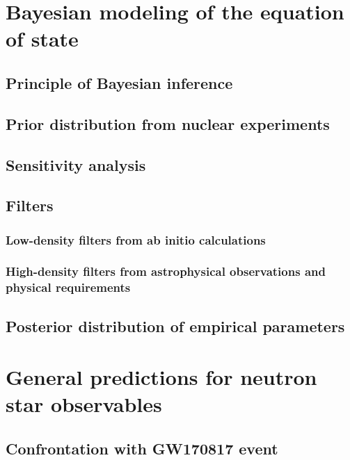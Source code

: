 \section{Bayesian modeling of the equation of state} %

\subsection{Principle of Bayesian inference} %

\subsection{Prior distribution from nuclear experiments} %

\subsection{Sensitivity analysis} %

\subsection{Filters} %

\subsubsection{Low-density filters from ab initio calculations} %

\subsubsection{High-density filters from astrophysical observations and 
physical requirements} %

\subsection{Posterior distribution of empirical parameters} %

\section{General predictions for neutron star observables} %

\subsection{Confrontation with GW170817 event} %

